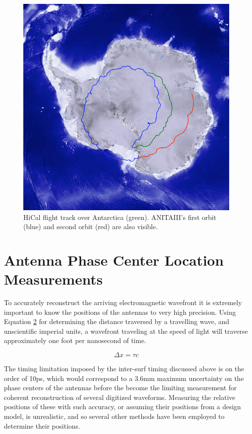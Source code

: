 	\begin{figure}
		\includegraphics[width=\textwidth]{figures/hiCalFlight}
		\caption{HiCal flight track over Antarctica (green). ANITAIII's first orbit (blue) and second orbit (red) are also visible.}
		\label{fig:hiCalFlight}
	\end{figure}		


\section{Antenna Phase Center Location Measurements}
	To accurately reconstruct the arriving electromagnetic wavefront it is extremely important to know the positions of the antennas to very high precision.   Using Equation \ref{eqn:lightTravel} for determining the distance traversed by a travelling wave, and unscientific imperial units, a wavefront traveling at the speed of light will traverse approximately one foot per nanosecond of time. 
	
	\begin{figure}[h]
	\begin{equation}
		\Delta x = \tau c
	\end{equation}
	\label{eqn:lightTravel}
	\end{figure}
	
	The timing limitation imposed by the inter-surf timing discussed above is on the order of 10ps, which would correspond to a 3.6mm maximum uncertainty on the phase centers of the antennas before the become the limiting measurement for coherent reconstruction of several digitized waveforms.  Measuring the relative positions of these with such accuracy, or assuming their positions from a design model, is unrealistic, and so several other methods have been employed to determine their positions.
	
